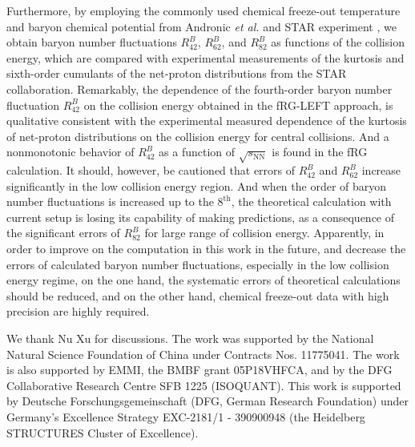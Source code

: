 \documentclass[%
reprint,
superscriptaddress,
showpacs,preprintnumbers,
amsmath,amssymb,
aps,
prd,
]{revtex4-1}
\begin{document}
	Furthermore, by employing the commonly used chemical freeze-out temperature and baryon chemical potential from Andronic {\it et al.} \cite{Andronic:2017pug} and STAR experiment \cite{Adamczyk:2017iwn}, we obtain baryon number fluctuations $R^{B}_{42}$, $R^{B}_{62}$, and $R^{B}_{82}$ as functions of the collision energy, which are compared with experimental measurements of the kurtosis and sixth-order cumulants of the net-proton distributions from the STAR collaboration. Remarkably, the dependence of the fourth-order baryon number fluctuation $R^{B}_{42}$ on the collision energy obtained in the fRG-LEFT approach, is qualitative consistent with the experimental measured dependence of the kurtosis of net-proton distributions on the collision energy for central collisions. And a nonmonotonic behavior of $R^{B}_{42}$ as a function of $\sqrt{s_{\mathrm{NN}}}$ is found in the fRG calculation. It should, however, be cautioned that errors of $R^{B}_{42}$ and $R^{B}_{62}$ increase significantly in the low collision energy region. And when the order of baryon number fluctuations is increased up to the $8^{\mathrm{th}}$, the theoretical calculation with current setup is losing its capability of making predictions, as a consequence of the significant errors of $R^{B}_{82}$ for large range of collision energy. Apparently, in order to improve on the computation in this work in the future, and decrease the errors of calculated baryon number fluctuations, especially in the low collision energy regime, on the one hand, the systematic errors of theoretical calculations should be reduced, and on the other hand, chemical freeze-out data with high precision are highly required.
	
	
	
	
	\begin{acknowledgments}
		
		We thank Nu Xu for discussions. The work was supported by the National Natural Science Foundation of China under Contracts Nos. 11775041. The work is also supported by EMMI, the BMBF grant 05P18VHFCA, and by the DFG Collaborative Research Centre SFB 1225 (ISOQUANT). This work is supported by Deutsche Forschungsgemeinschaft (DFG, German Research Foundation) under Germany’s Excellence Strategy EXC-2181/1 - 390900948 (the Heidelberg STRUCTURES Cluster of Excellence).
		
		
	\end{acknowledgments}
	
\end{document}
